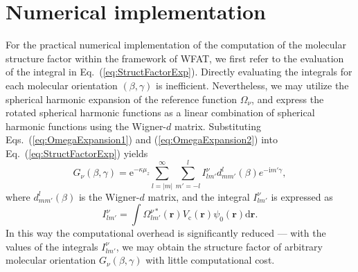 \documentclass[preprint,12pt]{elsarticle} %
\newcommand{\bn}[1]{\mathbf{#1}}    %
\renewcommand{\rm}[1]{\mathrm{#1}}    %
\newcommand{\dd}{\mathrm{d}}    %
\newcommand{\ii}{\mathrm{i}}    %
\newcommand{\ee}{\mathrm{e}}    %
\begin{document}
\section{Numerical implementation}
\label{sec:numerical}

For the practical numerical implementation of the computation of the molecular structure factor within the framework of WFAT, we first refer to the evaluation of the integral in Eq.~(\ref{eq:StructFactorExp}). Directly evaluating the integrals for each molecular orientation $(\beta,\gamma)$ is inefficient. Nevertheless, we may utilize the spherical harmonic expansion of the reference function $\Omega_\nu$, and express the rotated spherical harmonic functions as a linear combination of spherical harmonic functions using the Wigner-$d$ matrix. Substituting Eqs.~(\ref{eq:OmegaExpansion1}) and (\ref{eq:OmegaExpansion2}) into Eq.~(\ref{eq:StructFactorExp}) yields \cite{madsen_structure_2017}
\begin{equation}
    G_\nu(\beta,\gamma) = \ee^{-\kappa \mu_z} \sum_{l=|m|}^{\infty} \sum_{m'=-l}^l I_{l m'}^\nu  d_{m m'}^l(\beta) e^{-\ii m' \gamma},
    \label{eq:StructFactorExpInt}
\end{equation}
where $d_{m m'}^l(\beta)$ is the Wigner-$d$ matrix, and the integral $I_{l m'}^\nu$ is expressed as
\begin{equation}
    I_{l m'}^\nu = \int \Omega_{l m'}^{\nu *}(\bn{r}) V_{\rm{c}}(\bn{r}) \psi_0(\bn{r}) \dd \bn{r}.
    \label{eq:IntegralExpr}
\end{equation}
In this way the computational overhead is significantly reduced --- with the values of the integrals $I_{l m'}^\nu$, we may obtain the structure factor of arbitrary molecular orientation $G_\nu(\beta,\gamma)$ with little computational cost.
\end{document}
